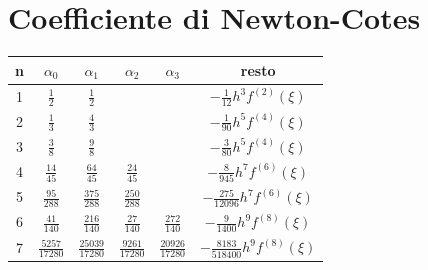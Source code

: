 \section{Coefficiente di Newton-Cotes}
\begin{center}
  \begin{tabular}{| c | c | c | c | c | c |}
    \hline
    n & $\alpha_0$ & $\alpha_1$ & $\alpha_2$ & $\alpha_3$ & resto \\
    \hline
    1 & $\frac{1}{2}$ & $\frac{1}{2}$ & & & $-\frac{1}{12}h^3f^{(2)}(\xi)$ \\
    \hline
    2 & $\frac{1}{3}$ & $\frac{4}{3}$ & & & $-\frac{1}{90}h^5f^{(4)}(\xi)$ \\
    \hline
    3 & $\frac{3}{8}$ & $\frac{9}{8}$ & & & $-\frac{3}{80}h^5f^{(4)}(\xi)$ \\
    \hline
    4 & $\frac{14}{45}$ & $\frac{64}{45}$ & $\frac{24}{45}$ & & $-\frac{8}{945}h^7f^{(6)}(\xi)$ \\
    \hline
    5 & $\frac{95}{288}$ & $\frac{375}{288}$ & $\frac{250}{288}$ & & $-\frac{275}{12096}h^7f^{(6)}(\xi)$ \\
    \hline
    6 & $\frac{41}{140}$ & $\frac{216}{140}$ & $\frac{27}{140}$ & $\frac{272}{140}$ & $-\frac{9}{1400}h^9f^{(8)}(\xi)$ \\
    \hline
    7 & $\frac{5257}{17280}$ & $\frac{25039}{17280}$ & $\frac{9261}{17280}$ & $\frac{20926}{17280}$ & $-\frac{8183}{518400}h^9f^{(8)}(\xi)$ \\
    \hline
  \end{tabular}
\end{center}

